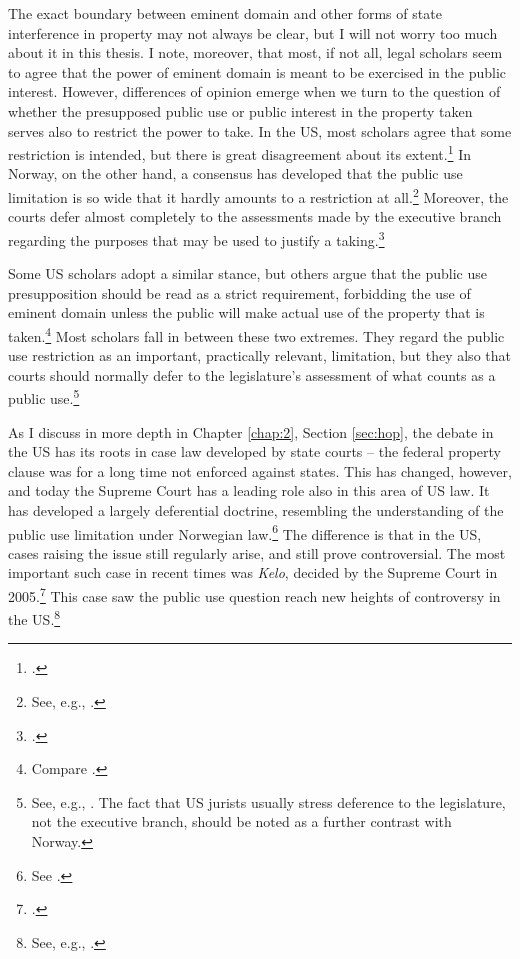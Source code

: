 The exact boundary between eminent domain and other forms of state interference in property may not always be clear, but I will not worry too much about it in this thesis. I note, moreover, that most, if not all, legal scholars seem to agree that the power of eminent domain is meant to be exercised in the public interest. However, differences of opinion emerge when we turn to the question of whether the presupposed public use or public interest in the property taken serves also to restrict the power to take. In the US, most scholars agree that some restriction is intended, but there is great disagreement about its extent.\footcite[205]{berger78} In Norway, on the other hand, a consensus has developed that the public use limitation is so wide that it hardly amounts to a restriction at all.\footnote{See, e.g., \cite[368]{aall10}.} Moreover, the courts defer almost completely to the assessments made by the executive branch regarding the purposes that may be used to justify a taking.\footcite[368]{aall10}

Some US scholars adopt a similar stance, but others argue that the public use presupposition should be read as a strict requirement, forbidding the use of eminent domain unless the public will make actual use of the property that is taken.\footnote{Compare \cite{bell06,bell09,claeys04,sandefur06}.} Most scholars fall in between these two extremes. They regard the public use restriction as an important, practically relevant, limitation, but they also  that courts should normally defer to the legislature's assessment of what counts as a public use.\footnote{See, e.g., \cite{merrill86,alexander05}. The fact that US jurists usually stress deference to the legislature, not the executive branch, should be noted as a further contrast with Norway.}

As I discuss in more depth in Chapter \ref{chap:2}, Section \ref{sec:hop}, the debate in the US has its roots in case law developed by state courts -- the federal property clause was for a long time not enforced against states. This has changed, however, and today the Supreme Court has a leading role also in this area of US law. It has developed a largely deferential doctrine, resembling the understanding of the public use limitation under Norwegian law.\footnote{See \cite{berman54,midkiff84,kelo05}.} The difference is that in the US, cases raising the issue  still regularly arise, and still prove controversial. The most important such case in recent times was {\it Kelo}, decided by the Supreme Court in 2005.\footcite{kelo05} This case saw the public use question reach new heights of controversy in the US.\footnote{See, e.g., \cite{somin09}.}

